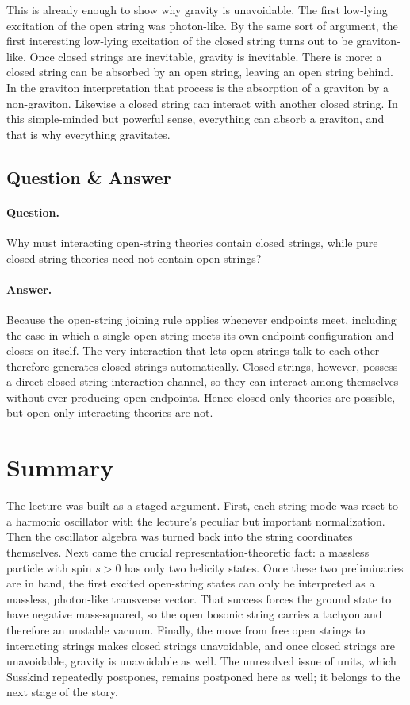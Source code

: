 This is already enough to show why gravity is unavoidable. The first low-lying excitation of the open string was photon-like. By the same sort of argument, the first interesting low-lying excitation of the closed string turns out to be graviton-like. Once closed strings are inevitable, gravity is inevitable. There is more: a closed string can be absorbed by an open string, leaving an open string behind. In the graviton interpretation that process is the absorption of a graviton by a non-graviton. Likewise a closed string can interact with another closed string. In this simple-minded but powerful sense, everything can absorb a graviton, and that is why everything gravitates.

\subsection{Question \& Answer}

\paragraph{Question.} Why must interacting open-string theories contain closed strings, while pure closed-string theories need not contain open strings?

\paragraph{Answer.} Because the open-string joining rule applies whenever endpoints meet, including the case in which a single open string meets its own endpoint configuration and closes on itself. The very interaction that lets open strings talk to each other therefore generates closed strings automatically. Closed strings, however, possess a direct closed-string interaction channel, so they can interact among themselves without ever producing open endpoints. Hence closed-only theories are possible, but open-only interacting theories are not.

\section{Summary}

The lecture was built as a staged argument. First, each string mode was reset to a harmonic oscillator with the lecture's peculiar but important normalization. Then the oscillator algebra was turned back into the string coordinates themselves. Next came the crucial representation-theoretic fact: a massless particle with spin \(s>0\) has only two helicity states. Once these two preliminaries are in hand, the first excited open-string states can only be interpreted as a massless, photon-like transverse vector. That success forces the ground state to have negative mass-squared, so the open bosonic string carries a tachyon and therefore an unstable vacuum. Finally, the move from free open strings to interacting strings makes closed strings unavoidable, and once closed strings are unavoidable, gravity is unavoidable as well. The unresolved issue of units, which Susskind repeatedly postpones, remains postponed here as well; it belongs to the next stage of the story.